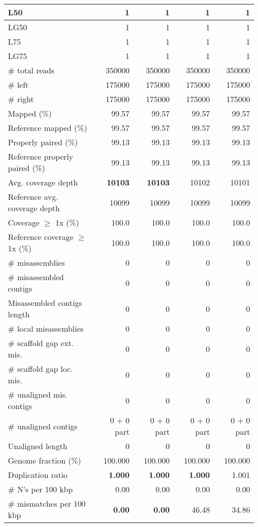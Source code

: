 \documentclass[12pt,a4paper]{article}
\begin{document}
\begin{table}[ht]
\begin{center}
\begin{tabular}{|l*{4}{|r}|}
L50 & 1 & 1 & 1 & 1 \\ \hline
LG50 & 1 & 1 & 1 & 1 \\ \hline
L75 & 1 & 1 & 1 & 1 \\ \hline
LG75 & 1 & 1 & 1 & 1 \\ \hline
\# total reads & 350000 & 350000 & 350000 & 350000 \\ \hline
\# left & 175000 & 175000 & 175000 & 175000 \\ \hline
\# right & 175000 & 175000 & 175000 & 175000 \\ \hline
Mapped (\%) & 99.57 & 99.57 & 99.57 & 99.57 \\ \hline
Reference mapped (\%) & 99.57 & 99.57 & 99.57 & 99.57 \\ \hline
Properly paired (\%) & 99.13 & 99.13 & 99.13 & 99.13 \\ \hline
Reference properly paired (\%) & 99.13 & 99.13 & 99.13 & 99.13 \\ \hline
Avg. coverage depth & {\bf 10103} & {\bf 10103} & 10102 & 10101 \\ \hline
Reference avg. coverage depth & 10099 & 10099 & 10099 & 10099 \\ \hline
Coverage $\geq$ 1x (\%) & 100.0 & 100.0 & 100.0 & 100.0 \\ \hline
Reference coverage $\geq$ 1x (\%) & 100.0 & 100.0 & 100.0 & 100.0 \\ \hline
\# misassemblies & 0 & 0 & 0 & 0 \\ \hline
\# misassembled contigs & 0 & 0 & 0 & 0 \\ \hline
Misassembled contigs length & 0 & 0 & 0 & 0 \\ \hline
\# local misassemblies & 0 & 0 & 0 & 0 \\ \hline
\# scaffold gap ext. mis. & 0 & 0 & 0 & 0 \\ \hline
\# scaffold gap loc. mis. & 0 & 0 & 0 & 0 \\ \hline
\# unaligned mis. contigs & 0 & 0 & 0 & 0 \\ \hline
\# unaligned contigs & 0 + 0 part & 0 + 0 part & 0 + 0 part & 0 + 0 part \\ \hline
Unaligned length & 0 & 0 & 0 & 0 \\ \hline
Genome fraction (\%) & 100.000 & 100.000 & 100.000 & 100.000 \\ \hline
Duplication ratio & {\bf 1.000} & {\bf 1.000} & {\bf 1.000} & 1.001 \\ \hline
\# N's per 100 kbp & 0.00 & 0.00 & 0.00 & 0.00 \\ \hline
\# mismatches per 100 kbp & {\bf 0.00} & {\bf 0.00} & 46.48 & 34.86 \\ \hline

\end{tabular}
\end{center}
\end{table}
\end{document}
